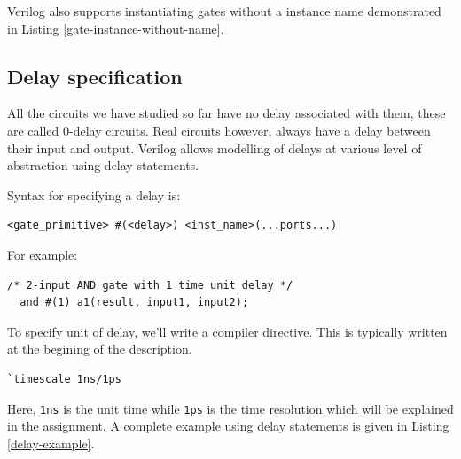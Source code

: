 \documentclass[a4paper,10pt]{article}
\theoremstyle{mytheor}
\newcommand{
  \insertverilog}[3]{
  
}
\begin{document}
\insertverilog{./verilog_files/gateLevelExample.v}{gate-level-impl}{\text{Example module using Gate-level modelling}}

Verilog also supports instantiating gates without a instance name
demonstrated in Listing \ref{gate-instance-without-name}.
\insertverilog{./verilog_files/unnamedGate.v}{gate-instance-without-name}{\text{Instantiating unnamed gates}}

\subsection{Delay specification}
All the circuits we have studied so far have no delay associated with
them, these are called 0-delay circuits. Real circuits however, always
have a delay between their input and output. Verilog allows modelling
of delays at various level of abstraction using delay statements.

Syntax for specifying a delay is:
\begin{lstlisting}[style=verilog-inline-style, xleftmargin=0.2\textwidth]
  <gate_primitive> #(<delay>) <inst_name>(...ports...) 
\end{lstlisting}

For example:
\begin{lstlisting}[style=verilog-inline-style, xleftmargin=0.25\textwidth]
  /* 2-input AND gate with 1 time unit delay */
  and #(1) a1(result, input1, input2);
\end{lstlisting}

\vspace{0.1cm} To specify unit of delay, we'll write a compiler
directive. This is typically written at the begining of the
description.

\begin{center}
  \begin{lstlisting}[style=verilog-inline-style,xleftmargin=.35\textwidth]
    `timescale 1ns/1ps
  \end{lstlisting}
\end{center}


Here, \lstinline[upquote=true]{1ns} is the unit time while
\lstinline[upquote=true]{1ps} is the time resolution which will be
explained in the assignment. A complete example using delay
statements is given in Listing \ref{delay-example}.

\insertverilog{./verilog_files/delayExample.v}{delay-example}{\text{Example usage of delays statement to specify propagation delay of logic gates.}}
\end{document}
